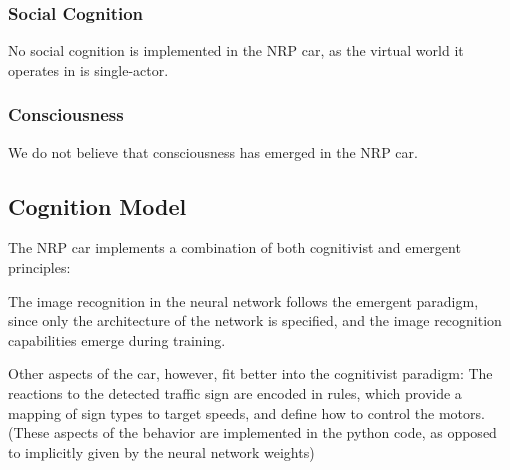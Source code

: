\subsubsection{Social Cognition}
No social cognition is implemented in the NRP car, as the virtual world it operates in is single-actor.

\subsubsection{Consciousness}
We do not believe that consciousness has emerged in the NRP car. 

\subsection{Cognition Model}
The NRP car implements a combination of both cognitivist and emergent principles:

The image recognition in the neural network follows the emergent paradigm, since only the architecture of the network is specified, and the image recognition capabilities emerge during training.

Other aspects of the car, however, fit better into the cognitivist paradigm: The reactions to the detected traffic sign are encoded in rules, which provide a mapping of sign types to target speeds, and define how to control the motors. (These aspects of the behavior are implemented in the python code, as opposed to implicitly given by the neural network weights)
